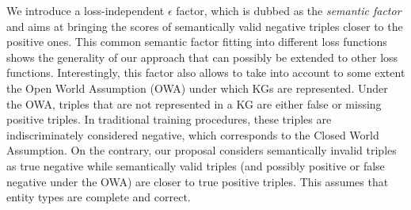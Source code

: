 \documentclass[letterpaper]{article} %
\begin{document}
We introduce a loss-independent $\epsilon$ factor, which is dubbed as the \textit{semantic factor} and aims at bringing the scores of semantically valid negative triples closer to the positive ones. This common semantic factor fitting into different loss functions shows the generality of our approach that can possibly be extended to other loss functions.
Interestingly, this factor also allows to take into account to some extent the Open World Assumption (OWA) under which KGs are represented. 
Under the OWA, triples that are not represented in a KG are either false or missing positive triples. 
In traditional training procedures, these triples are indiscriminately considered negative, which corresponds to the Closed World Assumption.
On the contrary, our proposal considers semantically invalid triples as true negative while semantically valid triples (and possibly positive or false negative under the OWA) are closer to true positive triples.
This assumes that entity types are complete and correct. 
	
\end{document}
